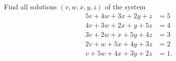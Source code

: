 Find all solutions $(v,w,x,y,z)$ of the system
\[\begin{aligned}5v+4w+3x+2y+z&=5\\4v+3w+2x+y+5z&=4\\3v+2w+x+5y+4z&=3\\2v+w+5x+4y+3z&=2\\v+5w+4x+3y+2z&=1.\end{aligned}\]
